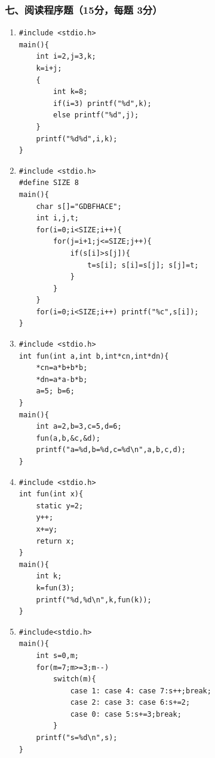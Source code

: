 \documentclass[12pt,a4paper]{article}
\begin{document}
\subsubsection*{七、阅读程序题（15分，每题 3分）}
\begin{enumerate}
    \item 
    \begin{verbatim}
#include <stdio.h>
main(){
    int i=2,j=3,k;
    k=i+j;
    {
        int k=8;
        if(i=3) printf("%d",k);
        else printf("%d",j);
    }
    printf("%d%d",i,k);
}
    \end{verbatim}
    
    \item 
    \begin{verbatim}
#include <stdio.h>
#define SIZE 8
main(){
    char s[]="GDBFHACE";
    int i,j,t;
    for(i=0;i<SIZE;i++){
        for(j=i+1;j<=SIZE;j++){
            if(s[i]>s[j]){
                t=s[i]; s[i]=s[j]; s[j]=t;
            }
        }
    }
    for(i=0;i<SIZE;i++) printf("%c",s[i]);
}
    \end{verbatim}
    
    \item 
    \begin{verbatim}
#include <stdio.h>
int fun(int a,int b,int*cn,int*dn){
    *cn=a*b+b*b;
    *dn=a*a-b*b;
    a=5; b=6;
}
main(){
    int a=2,b=3,c=5,d=6;
    fun(a,b,&c,&d);
    printf("a=%d,b=%d,c=%d\n",a,b,c,d);
}
    \end{verbatim}
    
    \item 
    \begin{verbatim}
#include <stdio.h>
int fun(int x){
    static y=2;
    y++;
    x+=y;
    return x;
}
main(){
    int k;
    k=fun(3);
    printf("%d,%d\n",k,fun(k));
}
    \end{verbatim}
    
    \item 
    \begin{verbatim}
#include<stdio.h>
main(){
    int s=0,m;
    for(m=7;m>=3;m--)
        switch(m){
            case 1: case 4: case 7:s++;break;
            case 2: case 3: case 6:s+=2;
            case 0: case 5:s+=3;break;
        }
    printf("s=%d\n",s);
}
    \end{verbatim}
\end{enumerate}
\end{document}

